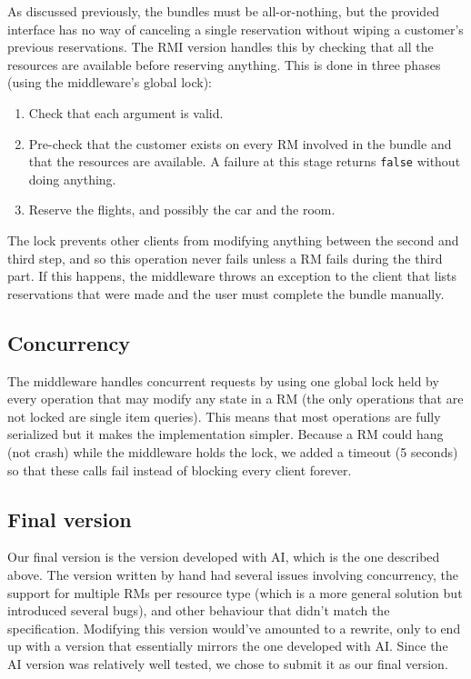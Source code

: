 \documentclass[10pt]{article}
\newcommand{\code}[1]{\lstinline{#1}}
\begin{document}
As discussed previously, the bundles must be all-or-nothing, but the provided
interface has no way of canceling a single reservation without wiping a
customer's previous reservations. The RMI version handles this by checking that
all the resources are available before reserving anything. This is done in three
phases (using the middleware's global lock):
\begin{enumerate}
\item Check that each argument is valid.
\item Pre-check that the customer exists on every RM involved in the bundle and
  that the resources are available. A failure at this stage returns \code{false}
  without doing anything.
\item Reserve the flights, and possibly the car and the room.
\end{enumerate}
The lock prevents other clients from modifying anything between the second and
third step, and so this operation never fails unless a RM fails during the third
part. If this happens, the middleware throws an exception to the client that lists
reservations that were made and the user must complete the bundle manually.

\subsection{Concurrency}

The middleware handles concurrent requests by using one global lock held by
every operation that may modify any state in a RM (the only operations that are
not locked are single item queries). This means that most operations are fully
serialized but it makes the implementation simpler. Because a RM could hang (not
crash) while the middleware holds the lock, we added a timeout (5 seconds) so
that these calls fail instead of blocking every client forever.

\subsection{Final version}

Our final version is the version developed with AI, which is the one described
above. The version written by hand had several issues involving concurrency, the
support for multiple RMs per resource type (which is a more general solution but
introduced several bugs), and other behaviour that didn't match the 
specification. Modifying this version would've amounted to a rewrite, only to
end up with a version that essentially mirrors the one developed with AI. Since
the AI version was relatively well tested, we chose to submit it as our final
version.
\end{document}
